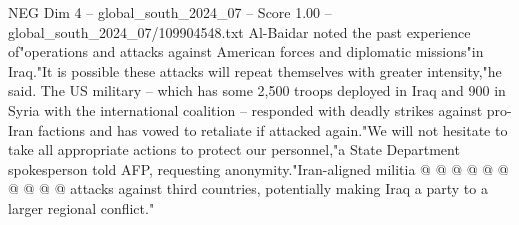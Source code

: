 \begin{textsample}{NEG Dim 4 – global\_south\_2024\_07 – Score 1.00 – global\_south\_2024\_07/109904548.txt}
Al-Baidar noted the past experience of"operations and attacks against American forces and diplomatic missions"in Iraq."It is possible these attacks will repeat themselves with greater intensity,"he said.
The US military -- which has some 2,500 troops deployed in Iraq and 900 in Syria with the international coalition -- responded with deadly strikes against pro-Iran factions and has vowed to retaliate if attacked again."We will not hesitate to take all appropriate actions to protect our personnel,"a State Department spokesperson told AFP, requesting anonymity."Iran-aligned militia @ @ @ @ @ @ @ @ @ @ attacks against third countries, potentially making Iraq a party to a larger regional conflict."

\end{textsample}
